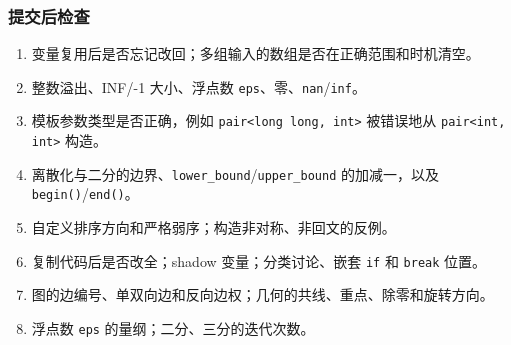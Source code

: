\subsubsection{提交后检查}
\begin{enumerate}[leftmargin=5mm]
  \setlength{\itemsep}{0pt}
  \item 变量复用后是否忘记改回；多组输入的数组是否在正确范围和时机清空。
  \item 整数溢出、INF/-1 大小、浮点数 \texttt{eps}、零、\texttt{nan}/\texttt{inf}。
  \item 模板参数类型是否正确，例如 \texttt{pair<long long, int>} 被错误地从 \texttt{pair<int, int>} 构造。
  \item 离散化与二分的边界、\texttt{lower\_bound}/\texttt{upper\_bound} 的加减一，以及 \texttt{begin()}/\texttt{end()}。
  \item 自定义排序方向和严格弱序；构造非对称、非回文的反例。
  \item 复制代码后是否改全；shadow 变量；分类讨论、嵌套 \texttt{if} 和 \texttt{break} 位置。
  \item 图的边编号、单双向边和反向边权；几何的共线、重点、除零和旋转方向。
  \item 浮点数 \texttt{eps} 的量纲；二分、三分的迭代次数。
\end{enumerate}
